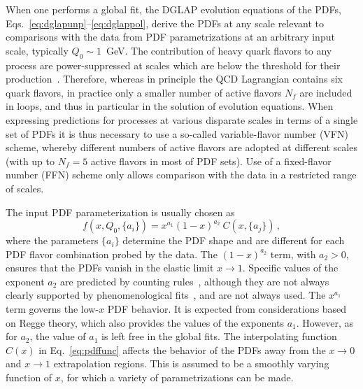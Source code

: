 When one performs a global fit, the DGLAP evolution equations of the PDFs, 
Eqs.~\eqref{eq:dglapunp}--\eqref{eq:dglappol}, derive the PDFs at any scale
relevant to comparisons with the data from PDF parametrizations at an
arbitrary input scale, typically $Q_0\sim 1$~GeV.
%
The contribution of heavy quark flavors to any process are 
power-suppressed at scales which are below the threshold for their 
production~\cite{Collins:1978wz}. 
%
Therefore, whereas in principle the QCD Lagrangian contains six quark flavors, 
in practice only a smaller number of active flavors $N_f$ are included in 
loops, and thus in particular in the solution of evolution equations. 
%
When expressing predictions for processes at various disparate scales in terms 
of a single set of PDFs it is thus necessary to use a so-called variable-flavor 
number (VFN) scheme, whereby different numbers of active flavors are adopted 
at different scales (with up to $N_f=5$ active flavors in most of PDF sets). 
%
Use of a fixed-flavor number (FFN)
scheme only allows comparison with the data in a restricted range of scales.

The input PDF parameterization is usually chosen as
\begin{equation}
\label{eq:pdffunc}
f(x,Q_0,\{a_i\})= x^{a_1}(1-x)^{a_2}\:C(x,\{a_j\})\, ,
\end{equation}
where the parameters $\{a_i\}$ determine the PDF shape
and are different for each PDF flavor combination probed by the data.
%
The $(1-x)^{a_2}$ term, with $a_{2}>0$, ensures that the PDFs vanish in the 
elastic limit $x\to 1$. 
%
Specific values of the exponent $a_2$ are predicted by counting 
rules~\cite{Brodsky:1973kr}, although they are not always clearly
supported by phenomenological fits~\cite{Ball:2016spl,Nocera:2014uea}, 
and are not always used.
%
The $x^{a_1}$ term governs the low-$x$ PDF behavior. 
%
It is expected from considerations based on Regge theory, 
which also provides the values of the exponents $a_1$.
%
However, as for $a_2$, the value of $a_1$ is left free in the global fits.
%
The interpolating function $C(x)$ in Eq.~\eqref{eq:pdffunc}
affects the behavior of the PDFs away from the $x\to 0$ and $x\to 1$
extrapolation regions.
%
This is assumed to be a smoothly varying function of $x$, for which a variety 
of parametrizations can be made.

